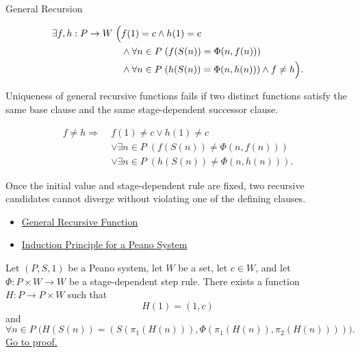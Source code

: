 \begin{topicbox}{General Recursion}
\begin{remark*}
\[
\begin{aligned}
\exists f,h:P\to W\;\Bigl(&
f(1)=c\land h(1)=c\\
&\land \forall n\in P\;(f(S(n))=\Phi(n,f(n)))\\
&\land \forall n\in P\;(h(S(n))=\Phi(n,h(n)))
\land f\neq h\Bigr).
\end{aligned}
\]
\end{remark*}

\begin{remark*}
Uniqueness of general recursive functions fails if two distinct functions
satisfy the same base clause and the same stage-dependent successor clause.
\end{remark*}

\begin{remark*}
\[
\begin{aligned}
f\neq h
\Longrightarrow\;&
f(1)\neq c\lor h(1)\neq c\\
&\lor \exists n\in P\;(f(S(n))\neq \Phi(n,f(n)))\\
&\lor \exists n\in P\;(h(S(n))\neq \Phi(n,h(n))).
\end{aligned}
\]
\end{remark*}

\begin{remark*}[Interpretation]
Once the initial value and stage-dependent rule are fixed, two recursive
candidates cannot diverge without violating one of the defining clauses.
\end{remark*}

\begin{remark*}[Dependencies]
\begin{itemize}
  \item \hyperref[def:general-recursive-function]{General Recursive Function}
  \item \hyperref[thm:induction-principle-for-peano-system]{Induction Principle for a Peano System}
\end{itemize}
\end{remark*}

\begin{tcolorbox}[colback=thmbox, colframe=thmborder, arc=2pt,
  left=6pt, right=6pt, top=4pt, bottom=4pt,
  title={\small\textbf{Theorem (General Recursion by State Encoding)}},
  fonttitle=\small\bfseries]
\begin{theorem}
\label{thm:general-recursion-by-state-encoding}
Let $(P,S,1)$ be a Peano system, let $W$ be a set, let $c\in W$, and let
$\Phi:P\times W\to W$ be a stage-dependent step rule. There exists a function
$H:P\to P\times W$ such that
\[
H(1)=(1,c)
\]
and
\[
\forall n\in P\;
\bigl(H(S(n))=(S(\pi_1(H(n))),\Phi(\pi_1(H(n)),\pi_2(H(n))))\bigr).
\]
\hyperref[prf:general-recursion-by-state-encoding]{Go to proof.}
\end{theorem}
\end{tcolorbox}


\end{topicbox}
